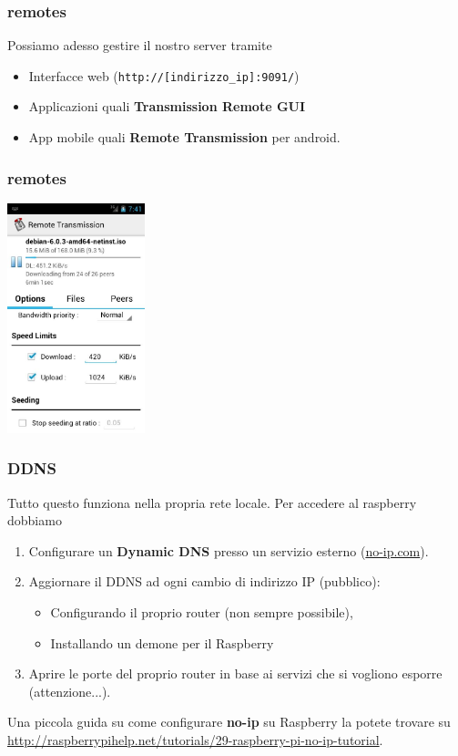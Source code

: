 \documentclass[xcolor=svgnames,11pt]{beamer}
\begin{document}
\begin{frame}\frametitle{remotes}
Possiamo adesso gestire il nostro server tramite
\begin{itemize}
  \item Interfacce web (\texttt{http://[indirizzo\_ip]:9091/})
  \item Applicazioni quali \textbf{Transmission Remote GUI}
  \item App mobile quali \textbf{Remote Transmission} per android.
\end{itemize}
\end{frame}

\begin{frame}\frametitle{remotes}
\begin{center}
\includegraphics[width=4cm]{remote-android.jpg}
\end{center}
\end{frame}

\begin{frame}\frametitle{DDNS}
Tutto questo funziona nella propria rete locale. Per accedere al raspberry dobbiamo
\begin{block}{}
\begin{enumerate}
  \item Configurare un \textbf{Dynamic DNS} presso un servizio esterno (\url{no-ip.com}).
  \item Aggiornare il DDNS ad ogni cambio di indirizzo IP (pubblico):
  \begin{itemize}
    \item Configurando il proprio router (non sempre possibile),
    \item Installando un demone per il Raspberry
  \end{itemize}
  \item Aprire le porte del proprio router in base ai servizi che si vogliono esporre (attenzione...).
\end{enumerate}
\end{block}{}

\medskip
Una piccola guida su come configurare \textbf{no-ip} su Raspberry la potete trovare su {\small \url{http://raspberrypihelp.net/tutorials/29-raspberry-pi-no-ip-tutorial}}.
\end{frame}
\end{document}
